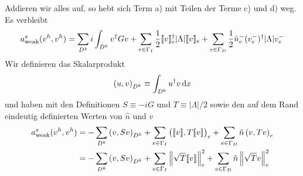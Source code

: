 Addieren wir alles auf, so hebt sich Term a) mit Teilen der Terme c) und d) weg. Es verbleibt
\begin{align*}
  a_\text{weak}^s(v^h, v^h) = \sum_{D^k} i \int_{D^k} v^{\dagger} G v
    + \sum_{e\in\Gamma_I} \frac{1}{2}\llbracket v \rrbracket_e^{\dagger} |\Lambda|\llbracket v \rrbracket_e
    + \sum_{e\in\Gamma_D} \frac{1}{2}\hat{n}_e^- (v_e^-)^{\dagger} |\Lambda|v_e^-
\end{align*}
Wir definieren das Skalarprodukt
\begin{align}
  \left(u,v\right)_{D^k} \equiv \int_{D^k} u^{\dagger} v \mathop{}\!\mathrm{d} x
\end{align}
und haben mit den Definitionen $S\equiv -iG$ und $T\equiv |\Lambda|/2$ sowie den auf dem Rand eindeutig definierten Werten von $\hat{n}$ und $v$
\begin{align}
  a_\text{weak}^s(v^h, v^h) &= -\sum_{D^k} \left(v,Sv\right)_{D^k}
    + \sum_{e\in\Gamma_I} \left(\llbracket v \rrbracket,T\llbracket v \rrbracket\right)_{e}
    + \sum_{e\in\Gamma_D} \hat{n} \left(v,T v\right)_{e}\\
    &= -\sum_{D^k} \left(v,Sv\right)_{D^k}
    + \sum_{e\in\Gamma_I} \left\lVert\sqrt{T}\llbracket v \rrbracket\right\rVert_{e}^2
    + \sum_{e\in\Gamma_D} \hat{n} \left\lVert\sqrt{T}v\right\rVert_{e}^2
\end{align}
